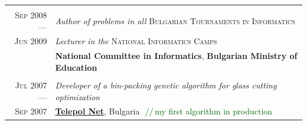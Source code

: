 \documentclass[a4paper,10pt]{article}
\def\myline{\color{linegray}\vline}
\newcommand{\minorcolor}[1]{\textcolor{mygray}{#1}}
\newcommand{\comment}[1]{\small\textcolor{darkgreen}{\,\,//\,#1}}
\newcommand{\mydate}[1]{\minorcolor{\textsc{#1}}}
\begin{document}
{\begin{tabular}{r!{\myline}p{14cm}}
	\\
	\mydate{Sep 2008 ---}     &  \textit{Author of problems in all} \textsc{Bulgarian Tournaments in Informatics}\\
	\mydate{Jun 2009}        &  \textit{Lecturer in the} \textsc{National Informatics Camps}\\
                                  &  \textbf{National Committee in Informatics}, \textbf{Bulgarian Ministry of Education}\\

	\\
	\mydate{Jul 2007 ---}     &  \textit{Developer of a bin-packing genetic algorithm for glass cutting optimization}\\
        \mydate{Sep 2007}        &  \textbf{\href{http://telepol.net/telepol.net/}{Telepol Net}}, Bulgaria \comment{my first algorithm in production}\\
	
\end{tabular}


}
\end{document}
